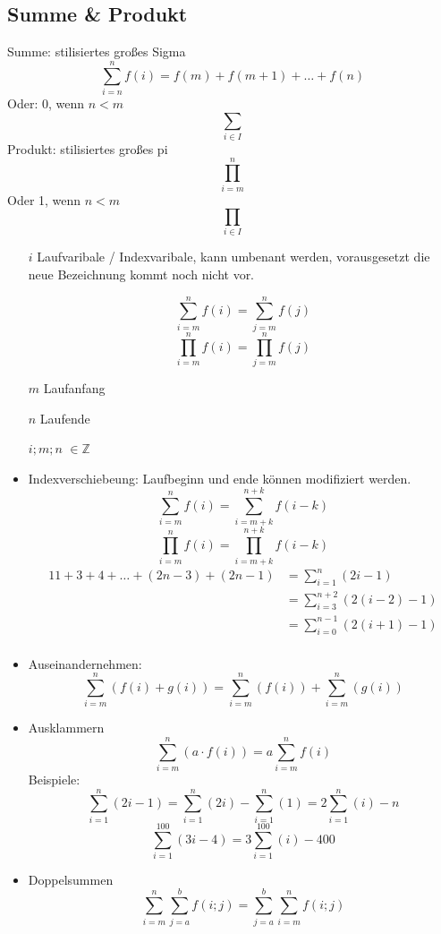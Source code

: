 \documentclass[12pt,a4paper]{article}
\begin{document}
\subsection{Summe \& Produkt}
Summe: stilisiertes großes Sigma
$$\sum\limits_{i = n}^n f(i) = f(m) + f(m + 1) + \dots + f(n)$$
Oder: 0, wenn $n < m$
$$\sum\limits_{i \in I}$$
Produkt: stilisiertes großes pi
$$\prod\limits_{i=m}^{n}$$
Oder 1, wenn $n < m$
$$\prod\limits_{i \in I}$$
\begin{itemize}
	\item[$i$] Laufvaribale / Indexvaribale, kann umbenant werden, vorausgesetzt die neue Bezeichnung kommt noch nicht vor.
	\item[] $$\sum\limits_{i = m}^n f(i) = \sum\limits_{j = m}^n f(j)$$
		$$\prod\limits_{i = m}^n f(i) = \prod\limits_{j = m}^n f(j)$$
	\item[$m$] Laufanfang
	\item[$n$] Laufende
	\item[$i;m;n$] $\in \mathbb{Z}$
	\item Indexverschiebeung: Laufbeginn und ende können modifiziert werden.
	      $$\sum\limits_{i=m}^n f(i) = \sum\limits_{i=m+k}^{n+k} f(i-k)$$
	      $$\prod\limits_{i=m}^n f(i) = \prod\limits_{i=m+k}^{n+k} f(i-k)$$
	      \begin{alignat*}{1}
		      1+3+4+\dots+(2n-3)+(2n-1) & = \sum\limits_{i = 1}^n (2i-1)             \\
		                                & = \sum\limits_{i = 3}^{n + 2} (2(i - 2)-1) \\
		                                & = \sum\limits_{i = 0}^{n - 1} (2(i + 1)-1) \\
	      \end{alignat*}
	\item Auseinandernehmen:
	      $$\sum\limits_{i=m}^n (f(i) + g(i)) = \sum\limits_{i=m}^n (f(i)) + \sum\limits_{i=m}^n (g(i))$$
	\item Ausklammern
	      $$\sum\limits_{i=m}^n (a \cdot f(i)) = a \sum\limits_{i=m}^n f(i)$$
	      Beispiele:
	      $$\sum\limits_{i=1}^n (2i-1) = \sum\limits_{i=1}^n (2i) - \sum\limits_{i=1}^n (1) = 2\sum\limits_{i=1}^n (i) - n$$
	      $$\sum\limits_{i=1}^{100} (3i-4) = 3\sum\limits_{i=1}^{100} (i) - 400$$
	\item Doppelsummen
	      $$\sum\limits_{i=m}^n \sum\limits_{j=a}^b f(i; j) = \sum\limits_{j=a}^b \sum\limits_{i=m}^n f(i; j)$$
\end{itemize}
\end{document}
